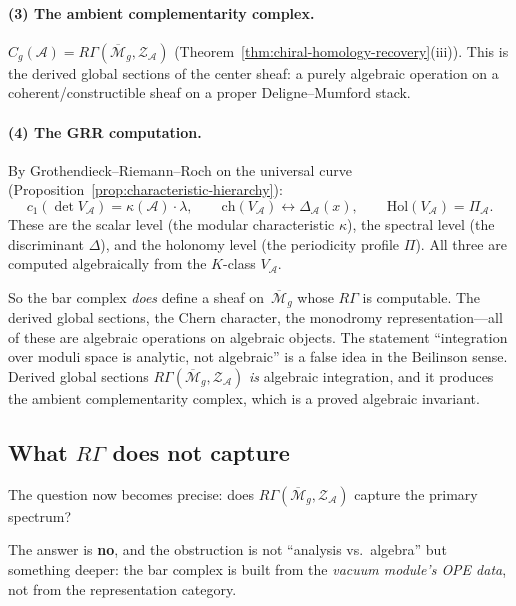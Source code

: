 \documentclass[11pt]{article}
\newcommand{\cA}{\mathcal{A}}
\newcommand{\cM}{\mathcal{M}}
\newcommand{\cZ}{\mathcal{Z}}
\begin{document}
\paragraph{(3) The ambient complementarity complex.}
$C_g(\cA) = R\Gamma(\overline{\cM}_g, \cZ_\cA)$
(Theorem~\ref{thm:chiral-homology-recovery}(iii)).
This is the derived global sections of the center sheaf:
a purely algebraic operation on a coherent/constructible sheaf
on a proper Deligne--Mumford stack.

\paragraph{(4) The GRR computation.}
By Grothendieck--Riemann--Roch on the universal curve
(Proposition~\ref{prop:characteristic-hierarchy}):
\[
c_1(\det V_\cA) = \kappa(\cA) \cdot \lambda,
\qquad
\mathrm{ch}(V_\cA) \leftrightarrow \Delta_\cA(x),
\qquad
\mathrm{Hol}(V_\cA) = \Pi_\cA.
\]
These are the scalar level (the modular characteristic $\kappa$),
the spectral level (the discriminant $\Delta$), and the
holonomy level (the periodicity profile $\Pi$).  All three
are computed algebraically from the $K$-class $V_\cA$.

\medskip

So the bar complex \emph{does} define a sheaf on~$\overline{\cM}_g$
whose $R\Gamma$ is computable.  The derived global sections, the
Chern character, the monodromy representation---all of these are
algebraic operations on algebraic objects.  The statement
``integration over moduli space is analytic, not algebraic'' is
a false idea in the Beilinson sense.  Derived global sections
$R\Gamma(\overline{\cM}_g, \cZ_\cA)$ \emph{is} algebraic
integration, and it produces the ambient complementarity complex,
which is a proved algebraic invariant.

\subsection{What $R\Gamma$ does not capture}

The question now becomes precise: does $R\Gamma(\overline{\cM}_g,
\cZ_\cA)$ capture the primary spectrum?

The answer is \textbf{no}, and the obstruction is not
``analysis vs.\ algebra'' but something deeper: the bar
complex is built from the \emph{vacuum module's OPE data},
not from the representation category.
\end{document}
